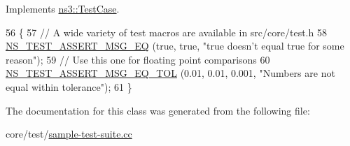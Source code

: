 Implements \hyperlink{classns3_1_1TestCase_a8ff74680cf017ed42011e4be51917a24}{ns3\+::\+Test\+Case}.


\begin{DoxyCode}
56 \{
57   \textcolor{comment}{// A wide variety of test macros are available in src/core/test.h}
58   \hyperlink{group__testing_ga2a9d78cffb3db8e867c35fff0b698cf5}{NS\_TEST\_ASSERT\_MSG\_EQ} (\textcolor{keyword}{true}, \textcolor{keyword}{true}, \textcolor{stringliteral}{"true doesn't equal true for some reason"});
59   \textcolor{comment}{// Use this one for floating point comparisons}
60   \hyperlink{group__testing_ga9e7861b56b4e70db3b56044cb7a28e41}{NS\_TEST\_ASSERT\_MSG\_EQ\_TOL} (0.01, 0.01, 0.001, \textcolor{stringliteral}{"Numbers are not equal within
       tolerance"});
61 \}
\end{DoxyCode}


The documentation for this class was generated from the following file\+:\begin{DoxyCompactItemize}
\item 
core/test/\hyperlink{sample-test-suite_8cc}{sample-\/test-\/suite.\+cc}\end{DoxyCompactItemize}
